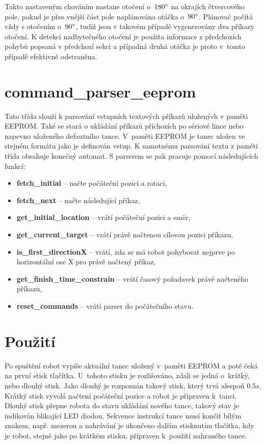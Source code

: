 \documentclass[12pt,a4paper]{report}
\newcommand{\ccc}[1]{\mbox{\fontfamily{lmtt}\selectfont\textbf{#1}}}
\begin{document}
Takto nastaveným chováním nastane otočení o~$180\degree$ na okrajích čtvercového pole, pokud je přes vnější část pole naplánována otáčka o~$90\degree$.
Plánovač počítá vždy s otočením o~$90\degree$, tudíž jsou v takovém případě vygenerovány
dva příkazy otočení. K detekci nadbytečného otočení je použita informace z předchozích
pohybů popsaná v předchozí sekci a případná druhá otáčka je proto v~tomto případě efektivně odstraněna.

\section*{\ccc{command\_parser\_eeprom}}
Tato třída slouží k parsování vstupních textových příkazů uložených v paměti EEPROM.
Také se stará o ukládání příkazů příchozích po sériové lince nebo napevno uloženého
defautního tance. V~paměti EEPROM je tanec uložen ve stejném formátu jako je definován
vstup. K samotnému parsování textu z paměti třída obsahuje konečný automat.
S parserem se pak pracuje pomocí následujících funkcí:
\begin{itemize}
\item \ccc{fetch\_initial} -- načte počáteční pozici a rotaci,
\item \ccc{fetch\_next} -- načte následující příkaz,
\item \ccc{get\_initial\_location} -- vrátí počáteční pozici a směr, 
\item \ccc{get\_current\_target} -- vrátí právě načtenou cílovou pozici příkazu,
\item \ccc{is\_first\_directionX} -- vrátí, zda se má robot pohybovat nejprve po horizontální ose X pro právě načtený příkaz,
\item \ccc{get\_finish\_time\_constrain} -- vrátí časový požadavek právě načteného příkazu,
\item \ccc{reset\_commands} -- vrátí parser do počátečního stavu. 
\end{itemize}


\section*{Použití}
Po spuštění robot vypíše aktuální tanec uložený v~paměti EEPROM a poté čeká na první stisk tlačítka. U~tohoto stisku je rozlišováno, zdali se jedná o~krátký, nebo dlouhý stisk. Jako dlouhý je rozpoznán takový stisk, který trvá alespoň $0.5s$. Krátký stisk vyvolá načtení počáteční pozice a robot je připraven k~tanci. Dlouhý stisk přepne robota do stavu ukládání nového tance, takový stav je indikován blikající LED diodou. Sekvence instrukcí tance musí končit bílým znakem, např. mezerou a nahrávání je ukončeno dalším stisknutím tlačítka, kdy je robot, stejně jako po krátkém stisku, připraven k~použití nahraného tance.
\end{document}
